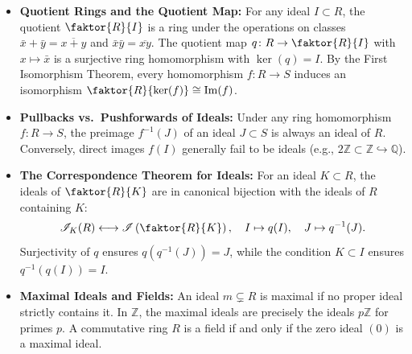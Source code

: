 \begin{overview}
\begin{itemize}
    \item \textbf{Quotient Rings and the Quotient Map:} For any ideal $I \subset R$, the quotient $\faktor{R}{I}$ is a ring under the operations on classes $\bar{x} + \bar{y} = \overline{x+y}$ and $\bar{x} \bar{y} = \overline{x y}$. The quotient map $q \colon R \to \faktor{R}{I}$ with $x \mapsto \bar{x}$ is a surjective ring homomorphism with $\ker(q) = I$. By the First Isomorphism Theorem, every homomorphism $f \colon R \to S$ induces an isomorphism $\faktor{R}{\ker(f)} \cong \operatorname{Im}(f)$.
    \item \textbf{Pullbacks vs.\ Pushforwards of Ideals:} Under any ring homomorphism $f \colon R \to S$, the preimage $f^{-1}(J)$ of an ideal $J \subset S$ is always an ideal of $R$. Conversely, direct images $f(I)$ generally fail to be ideals (e.g., $2\mathbb{Z} \subset \mathbb{Z} \hookrightarrow \mathbb{Q}$).
    \item \textbf{The Correspondence Theorem for Ideals:} For an ideal $K \subset R$, the ideals of $\faktor{R}{K}$ are in canonical bijection with the ideals of $R$ containing $K$:
    \[
    \mathscr{I}_K(R) \longleftrightarrow \mathscr{I}\left(\faktor{R}{K}\right), \quad I \mapsto q(I), \quad J \mapsto q^{-1}(J).
    \]
    Surjectivity of $q$ ensures $q(q^{-1}(J)) = J$, while the condition $K \subset I$ ensures $q^{-1}(q(I)) = I$.
    \item \textbf{Maximal Ideals and Fields:} An ideal $m \subsetneq R$ is maximal if no proper ideal strictly contains it. In $\mathbb{Z}$, the maximal ideals are precisely the ideals $p\mathbb{Z}$ for primes $p$. A commutative ring $R$ is a field if and only if the zero ideal $(0)$ is a maximal ideal.
\end{itemize}
\end{overview}